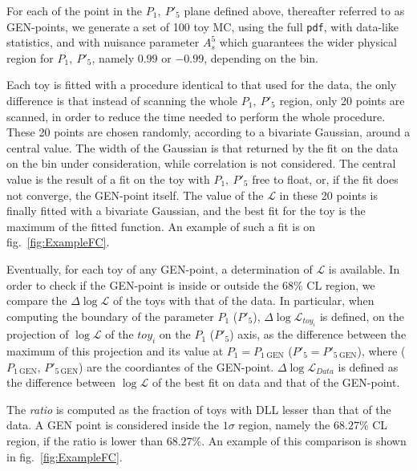 For each of the point in the $P_1,~P'_5$ plane defined above, thereafter referred to as GEN-points, we generate a set of 100 toy MC, using the full {\tt pdf}, with data-like statistics, and with nuisance parameter $A_s^5$ which guarantees the wider physical region for $P_1,~P'_5$, namely $0.99$ or $-0.99$, depending on the bin.

Each toy is fitted with a procedure identical to that used for the data, the only difference is that instead of scanning the whole $P_1,~P'_5$ region, only 20 points are scanned, in order to reduce the time needed to perform the whole procedure.
These 20 points are chosen randomly, according to a bivariate Gaussian, around a central value.
The width of the Gaussian is that returned by the fit on the data on the bin under consideration, while correlation is not considered.
The central value is the result of a fit on the toy with $P_1,~P'_5$ free to float, or, if the fit does not converge, the GEN-point itself.
The value of the $\mathcal{L}$ in these 20 points is finally fitted with a bivariate Gaussian, and the best fit for the toy is the maximum of the fitted function.
An example of such a fit is on fig.~\ref{fig:ExampleFC}.

Eventually, for each toy of any GEN-point, a determination of $\mathcal{L}$ is available.
In order to check if the GEN-point is inside or outside the $68\%$ CL region, we compare the $\Delta\log\mathcal{L}$ of the toys with that of the data.
In particular, when computing the boundary of the parameter $P_1$ ($P'_5$), $\Delta\log\mathcal{L}_{toy_{i}}$ is defined, on the projection of $\log\mathcal{L}$ of the $toy_{i}$ on the $P_1$ ($P'_5$) axis, as the difference between the maximum of this projection and its value at $P_1=P_{1~\mathrm{GEN}}$ ($P'_5=P'_{5~\mathrm{GEN}}$), where ($P_{1~\mathrm{GEN}}$, $P'_{5~\mathrm{GEN}}$) are the coordiantes of the GEN-point.
$\Delta\log\mathcal{L}_{Data}$ is defined as the difference between $\log\mathcal{L}$ of the best fit on data and that of the GEN-point.

The {\em ratio} is computed as the fraction of toys with DLL lesser than that of the data.
A GEN point is considered inside the $1\sigma$ region, namely the $68.27\%$ CL region, if the ratio is lower than $68.27\%$.
An example of this comparison is shown in fig.~\ref{fig:ExampleFC}.

